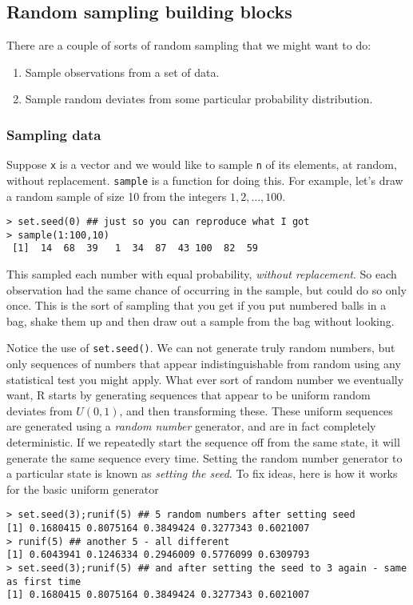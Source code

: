 \documentclass[10pt] {article}
\theoremstyle{definition}
\begin{document}
\subsection{Random sampling building blocks}

There are a couple of sorts of random sampling that we might want to do:
\begin{enumerate}
\item Sample observations from a set of data. 
\item Sample random deviates from some particular probability distribution. 
\end{enumerate}

\subsubsection{Sampling data}
Suppose {\tt x} is a vector and we would like to sample {\tt n} of its elements, at random, without replacement. {\tt sample} is a function for doing this. For example, let's draw a random sample of size 10 from the integers $1,2,\ldots,100$.
\begin{lstlisting}
> set.seed(0) ## just so you can reproduce what I got
> sample(1:100,10)
 [1]  14  68  39   1  34  87  43 100  82  59
\end{lstlisting}
This sampled each number with equal probability, {\em without replacement}. So each observation had the same chance of occurring in the sample, but could do so only once. This is the sort of sampling that you get if you put numbered balls in a bag, shake them up and then draw out a sample from the bag without looking. 

Notice the use of \lstinline+set.seed()+. We can not generate truly random numbers, but only sequences of numbers that appear indistinguishable from random using any statistical test you might apply. What ever sort of random number we eventually want, R starts by generating sequences that appear to be uniform random deviates from $U(0,1)$, and then transforming these. These uniform sequences are generated using a {\em random number} generator, and are in fact completely deterministic. If we repeatedly start the sequence off from the same state, it will generate the same sequence every time. Setting the random number generator to a particular state is known as {\em setting the seed}. To fix ideas, here is how it works for the basic uniform generator
\begin{lstlisting}
> set.seed(3);runif(5) ## 5 random numbers after setting seed
[1] 0.1680415 0.8075164 0.3849424 0.3277343 0.6021007
> runif(5) ## another 5 - all different
[1] 0.6043941 0.1246334 0.2946009 0.5776099 0.6309793
> set.seed(3);runif(5) ## and after setting the seed to 3 again - same as first time
[1] 0.1680415 0.8075164 0.3849424 0.3277343 0.6021007
\end{lstlisting}
\end{document}
